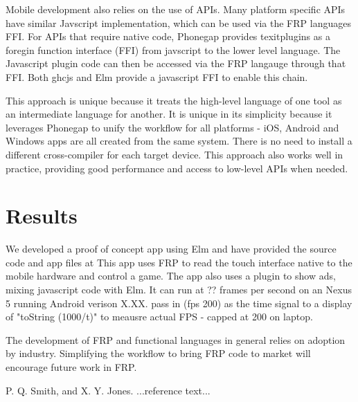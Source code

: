 \documentclass{preprint}
\begin{document}
Mobile development also relies on the use of APIs.
Many platform specific APIs have similar Javscript implementation, which can be used via the FRP languages FFI.
For APIs that require native code, Phonegap provides texit{plugins} as a foregin function interface (FFI) from javscript to the lower level language.
The Javascript plugin code can then be accessed via the FRP langauge through that FFI.
Both ghcjs and Elm provide a javascript FFI to enable this chain. 

This approach is unique because it treats the high-level language of one tool as an intermediate language for another. 
It is unique in its simplicity because it leverages Phonegap to unify the workflow for all platforms - iOS, Android and Windows apps are all created from the same system.
There is no need to install a different cross-compiler for each target device.
This approach also works well in practice, providing good performance and access to low-level APIs when needed.


\section{Results}
We developed a proof of concept app using Elm and have provided the source code and app files at %
This app uses FRP to read the touch interface native to the mobile hardware and control a game.
The app also uses a plugin to show ads, mixing javascript code with Elm.
It can run at ?? frames per second on an Nexus 5 running Android verison X.XX.
pass in (fps 200) as the time signal to a display of "toString (1000/t)" to meausre actual FPS - capped at 200 on laptop. 
 
The development of FRP and functional languages in general relies on adoption by industry.
Simplifying the workflow to bring FRP code to market will encourage future work in FRP.





\begin{thebibliography}{}
\softraggedright

P. Q. Smith, and X. Y. Jones. ...reference text...

\end{thebibliography}
\end{document}
